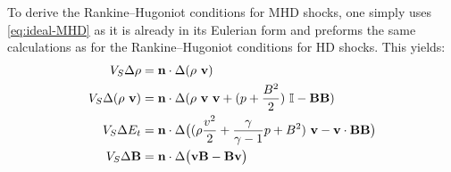 To derive the Rankine–Hugoniot conditions for MHD shocks, one simply uses \cref{eq:ideal-MHD} as it is already in its Eulerian form and preforms the same calculations as for the Rankine–Hugoniot conditions for HD shocks. 
This yields:
\begin{equation}
\label{eq:MHD-shock-conditions}
\begin{split}
V_S \Delta \rho &= \vec{n}\cdot\Delta(\rho \ \vec{v})\\
V_S \Delta (\rho \ \vec{v}) &= \vec{n} \cdot \Delta(\rho \ \vec{v} \ \vec{v} + (p + \frac{B^2}{2}) \ \I -  \vec{B}\vec{B}) \\
V_S \Delta E_t &= \vec{n} \cdot \Delta \big( (\rho \frac{v^2}{2} + \frac{\gamma}{\gamma - 1} p + B^2) \ \vec{v} - \vec{v} \cdot \vec{B} \vec{B} \big) \\
V_S \Delta \vec{B} &= \vec{n} \cdot \Delta \big( \vec{v} \vec{B} - \vec{B} \vec{v} \big)
\end{split}
\end{equation}





